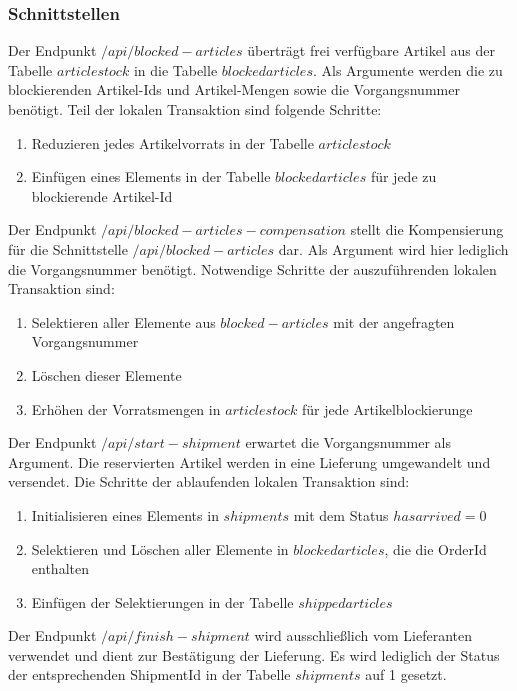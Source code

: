 \subsubsection{Schnittstellen}

Der Endpunkt $/api/blocked-articles$ überträgt frei verfügbare Artikel aus der Tabelle $articlestock$ in die Tabelle $blockedarticles$. Als Argumente werden die zu blockierenden Artikel-Ids und Artikel-Mengen sowie die Vorgangsnummer benötigt. Teil der lokalen Transaktion sind folgende Schritte:
\begin{enumerate}
	\item Reduzieren jedes Artikelvorrats in der Tabelle $articlestock$
	\item Einfügen eines Elements in der Tabelle $blockedarticles$ für jede zu blockierende Artikel-Id
\end{enumerate}

Der Endpunkt $/api/blocked-articles-compensation$ stellt die Kompensierung für die Schnittstelle $/api/blocked-articles$ dar. Als Argument wird hier lediglich die Vorgangsnummer benötigt. Notwendige Schritte der auszuführenden lokalen Transaktion sind:
\begin{enumerate}
	\item Selektieren aller Elemente aus $blocked-articles$ mit der angefragten Vorgangsnummer
	\item Löschen dieser Elemente
	\item Erhöhen der Vorratsmengen in $articlestock$ für jede Artikelblockierunge
\end{enumerate}

Der Endpunkt $/api/start-shipment$ erwartet die Vorgangsnummer als Argument. Die reservierten Artikel werden in eine Lieferung umgewandelt und versendet. Die Schritte der ablaufenden lokalen Transaktion sind:
\begin{enumerate}
	\item Initialisieren eines Elements in $shipments$ mit dem Status $hasarrived=0$
	\item Selektieren und Löschen aller Elemente in $blockedarticles$, die die OrderId enthalten
	\item Einfügen der Selektierungen in der Tabelle $shippedarticles$
\end{enumerate}

Der Endpunkt $/api/finish-shipment$ wird ausschließlich vom Lieferanten verwendet und dient zur Bestätigung der Lieferung. Es wird lediglich der Status der entsprechenden ShipmentId in der Tabelle $shipments$ auf 1 gesetzt.

